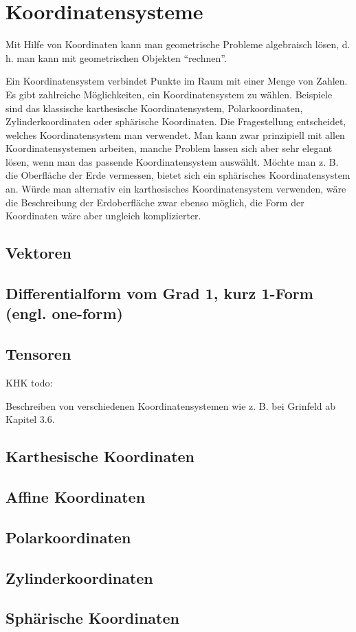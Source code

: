 \section{Koordinatensysteme}

Mit Hilfe von Koordinaten kann man geometrische Probleme algebraisch lösen, d. h. man kann mit geometrischen Objekten "`rechnen"'. 

Ein Koordinatensystem verbindet Punkte im Raum mit einer Menge von Zahlen. Es gibt zahlreiche Möglichkeiten, ein Koordinatensystem zu wählen. Beispiele sind das klassische karthesische Koordinatensystem, Polarkoordinaten, Zylinderkoordinaten oder sphärische Koordinaten. Die Fragestellung entscheidet, welches Koordinatensystem man verwendet. Man kann zwar prinzipiell mit allen Koordinatensystemen arbeiten, manche Problem lassen sich aber sehr elegant lösen, wenn man das passende Koordinatensystem auswählt. Möchte man z. B. die Oberfläche der Erde vermessen, bietet sich ein sphärisches Koordinatensystem an. Würde man alternativ ein karthesisches Koordinatensystem verwenden, wäre die Beschreibung der Erdoberfläche zwar ebenso möglich, die Form der Koordinaten wäre aber ungleich komplizierter.

\subsection{Vektoren}
\subsection{ Differentialform vom Grad 1, kurz 1-Form (engl. one-form)}
\subsection{Tensoren}


KHK todo:

Beschreiben von verschiedenen Koordinatensystemen wie z. B. bei Grinfeld ab Kapitel 3.6.

\subsection{Karthesische Koordinaten}

\subsection{Affine Koordinaten}

\subsection{Polarkoordinaten}

\subsection{Zylinderkoordinaten}

\subsection{Sphärische Koordinaten}

